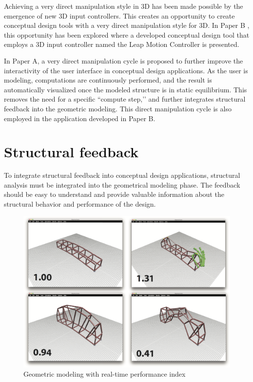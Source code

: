 Achieving a very direct manipulation style in 3D has been made possible by the emergence of new 3D input controllers. This creates an opportunity to create conceptual design tools with a very direct manipulation style for 3D. In Paper B , this opportunity has been explored where a developed conceptual design tool that employs a 3D input controller named the Leap Motion Controller is presented. 

In Paper A, a very direct manipulation cycle is proposed to further improve the interactivity of the user interface in conceptual design applications. As the user is modeling, computations are continuously performed, and the result is automatically visualized once the modeled structure is in static equilibrium. This removes the need for a specific ``compute step,’’ and further integrates structural feedback into the geometric modeling. This direct manipulation cycle is also employed in the application developed in Paper B.

\section{Structural feedback}
To integrate structural feedback into conceptual design applications, structural analysis must be integrated into the geometrical modeling phase. The feedback should be easy to understand and provide valuable information about the structural behavior and performance of the design.

\begin{figure}
  \includegraphics[width=350pt]{graphics/performance-feedbacku.png}
  \caption{Geometric modeling with real-time performance index}
  \label{fig:performance-feedback}
\end{figure}


